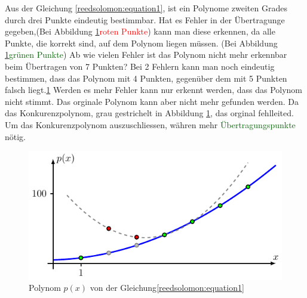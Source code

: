\begin{beispiel}
Aus der Gleichung \eqref{reedsolomon:equation1},
ist ein Polynome zweiten Grades durch drei Punkte eindeutig bestimmbar.
Hat es Fehler in der Übertragunge gegeben,(Bei Abbildung \ref{fig:polynom}\textcolor{red}{roten Punkte}) kann man diese erkennen,
da alle Punkte, die korrekt sind, auf dem Polynom liegen müssen. 
(Bei Abbildung \ref{fig:polynom}\textcolor{darkgreen}{grünen Punkte})
Ab wie vielen Fehler ist das Polynom nicht mehr erkennbar beim Übertragen von 7 Punkten?
Bei 2 Fehlern kann man noch eindeutig bestimmen, dass das Polynom mit 4 Punkten,
gegenüber dem mit 5 Punkten falsch liegt.\ref{fig:polynom}
Werden es mehr Fehler kann nur erkennt werden, dass das Polynom nicht stimmt.
Das orginale Polynom kann aber nicht mehr gefunden werden.
Da das Konkurenzpolynom, grau gestrichelt in Abbildung \ref{fig:polynom}, das orginal fehlleited.
Um das Konkurenzpolynom auszuschliessen, währen mehr \textcolor{darkgreen}{Übertragungspunkte} nötig.
\end{beispiel}

\begin{figure}
	\centering
	\includegraphics[width=\textwidth]{papers/reedsolomon/figures/polynom2}
	\caption{Polynom $p(x)$ von der Gleichung\eqref{reedsolomon:equation1}}
	\label{fig:polynom}
\end{figure}

